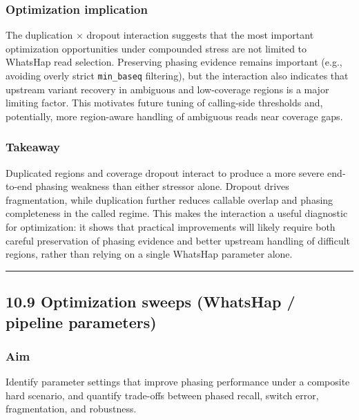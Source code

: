 \documentclass[
]{article}
\begin{document}
\subsubsection{Optimization implication}\label{optimization-implication}

The duplication × dropout interaction suggests that the most important
optimization opportunities under compounded stress are not limited to
WhatsHap read selection. Preserving phasing evidence remains important
(e.g., avoiding overly strict \texttt{min\_baseq} filtering), but the
interaction also indicates that upstream variant recovery in ambiguous
and low-coverage regions is a major limiting factor. This motivates
future tuning of calling-side thresholds and, potentially, more
region-aware handling of ambiguous reads near coverage gaps.

\subsubsection{Takeaway}\label{takeaway-6}

Duplicated regions and coverage dropout interact to produce a more
severe end-to-end phasing weakness than either stressor alone. Dropout
drives fragmentation, while duplication further reduces callable overlap
and phasing completeness in the called regime. This makes the
interaction a useful diagnostic for optimization: it shows that
practical improvements will likely require both careful preservation of
phasing evidence and better upstream handling of difficult regions,
rather than relying on a single WhatsHap parameter alone.

\begin{center}\rule{0.5\linewidth}{0.5pt}\end{center}

\subsection{10.9 Optimization sweeps (WhatsHap / pipeline
parameters)}\label{optimization-sweeps-whatshap-pipeline-parameters}

\subsubsection{Aim}\label{aim-7}

Identify parameter settings that improve phasing performance under a
composite hard scenario, and quantify trade-offs between phased recall,
switch error, fragmentation, and robustness.
\end{document}
